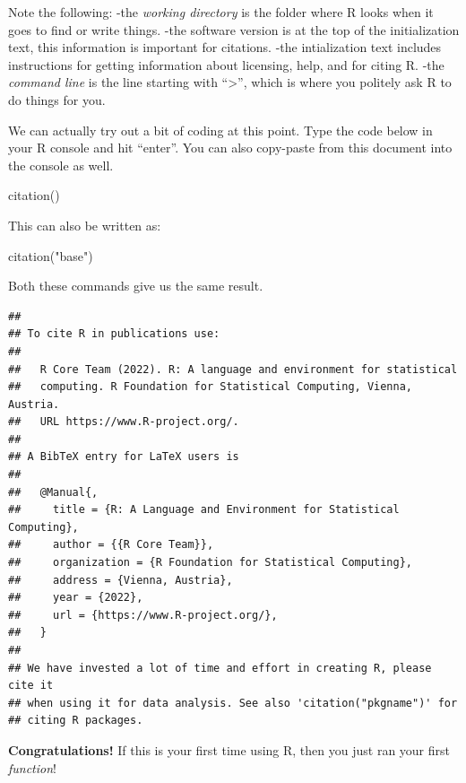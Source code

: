 \documentclass[
]{article}
\newenvironment{Shaded}{\begin{snugshade}}{\end{snugshade}}
\newcommand{\FunctionTok}[1]{\textcolor[rgb]{0.00,0.00,0.00}{#1}}
\newcommand{\NormalTok}[1]{#1}
\newcommand{\StringTok}[1]{\textcolor[rgb]{0.31,0.60,0.02}{#1}}
\begin{document}
Note the following: -the \emph{working directory} is the folder where R
looks when it goes to find or write things. -the software version is at
the top of the initialization text, this information is important for
citations. -the intialization text includes instructions for getting
information about licensing, help, and for citing R. -the \emph{command
line} is the line starting with ``\textgreater{}'', which is where you
politely ask R to do things for you.

We can actually try out a bit of coding at this point. Type the code
below in your R console and hit ``enter''. You can also copy-paste from
this document into the console as well.

\begin{Shaded}
\begin{Highlighting}[]
\FunctionTok{citation}\NormalTok{()}
\end{Highlighting}
\end{Shaded}

\hfill\break

This can also be written as:

\begin{Shaded}
\begin{Highlighting}[]
\FunctionTok{citation}\NormalTok{(}\StringTok{"base"}\NormalTok{)}
\end{Highlighting}
\end{Shaded}

\hfill\break

Both these commands give us the same result.

\begin{verbatim}
## 
## To cite R in publications use:
## 
##   R Core Team (2022). R: A language and environment for statistical
##   computing. R Foundation for Statistical Computing, Vienna, Austria.
##   URL https://www.R-project.org/.
## 
## A BibTeX entry for LaTeX users is
## 
##   @Manual{,
##     title = {R: A Language and Environment for Statistical Computing},
##     author = {{R Core Team}},
##     organization = {R Foundation for Statistical Computing},
##     address = {Vienna, Austria},
##     year = {2022},
##     url = {https://www.R-project.org/},
##   }
## 
## We have invested a lot of time and effort in creating R, please cite it
## when using it for data analysis. See also 'citation("pkgname")' for
## citing R packages.
\end{verbatim}

\hfill\break

\textbf{Congratulations!} If this is your first time using R, then you
just ran your first \emph{function}!
\end{document}
